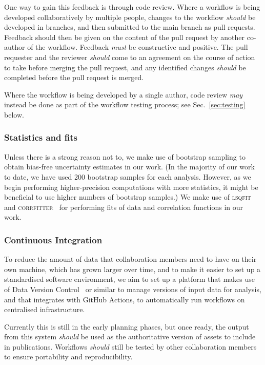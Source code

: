 \documentclass{article}
\newcommand\rfcword[1]{\emph{#1}\xspace}
\newcommand\must{\rfcword{must}}
\newcommand\should{\rfcword{should}}
\newcommand\may{\rfcword{may}}
\newcommand\program[1]{\textsc{#1}\xspace}
\begin{document}
One way to gain this feedback is through code review.
Where a workflow is being developed collaboratively by multiple people,
changes to the workflow \should be developed in branches,
and then submitted to the main branch as pull requests.
Feedback should then be given on the content of the pull request
by another co-author of the workflow.
Feedback \must be constructive and positive.
The pull requester and the reviewer \should come to an agreement on
the course of action to take before merging the pull request,
and any identified changes \should be completed before the pull request is merged.

Where the workflow is being developed by a single author,
code review \may instead be done as part of the workflow testing process;
see Sec.~\ref{sec:testing} below.

\subsubsection{Statistics and fits}

Unless there is a strong reason not to,
we make use of bootstrap sampling
to obtain bias-free uncertainty estimates in our work.
(In the majority of our work to date,
we have used 200 bootstrap samples for each analysis.
However,
as we begin performing higher-precision computations with more statistics,
it might be beneficial to use higher numbers of bootstrap samples.)
We make use of
\program{lsqfit}~\cite{lsqfit,peter_lepage_2024_12690493}
and \program{corrfitter}~\cite{corrfitter,peter_lepage_2021_5733391}
for performing fits of data and correlation functions in our work.

\subsubsection{Continuous Integration}

To reduce the amount of data that collaboration members need to have on their own machine,
which has grown larger over time,
and to make it easier to set up a standardised software environment,
we aim to set up a platform
that makes use of Data Version Control~\cite{dvc} or similar
to manage versions of input data for analysis,
and that integrates with GitHub Actions,
to automatically run workflows on centralised infrastructure.

Currently this is still in the early planning phases,
but once ready,
the output from this system \should be used as
the authoritative version of assets to include in publications.
Workflows \should still be tested by other collaboration members to ensure portability and reproducibility.
\end{document}
